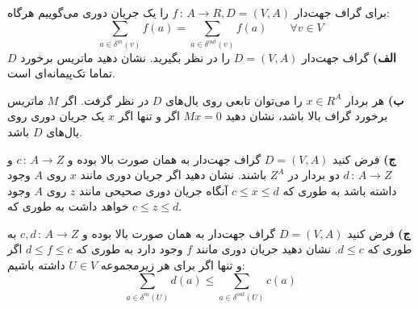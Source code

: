 برای گراف جهت‌دار
$f\,:\,A \to R, D = (V,A)$
را یک جریان دوری می‌گوییم هرگاه:
\[
    \sum_{a \in \delta^{in}(v)} f(a) =  \sum_{a \in \delta^{out}(v)} f(a) \quad \quad \forall v \in V
\]
\vspace*{5pt}
\textbf{الف)}
گراف جهت‌دار
$D = (V, A)$
را در نظر بگیرید. نشان دهید ماتریس برخورد
$D$
تماما تک‌پیمانه‌ای است.

\vspace*{5pt}
\textbf{ب)}
هر بردار
$x \in R^{A}$
را می‌توان تابعی روی یال‌های
$D$
در نظر گرفت. اگر
$M$
ماتریس برخورد گراف بالا باشد، نشان دهید
$M x = 0$
اگر و تنها اگر
$x$
یک جریان دوری روی یال‌های
$D$
باشد.

\vspace*{5pt}
\textbf{ج)}
فرض کنید
$D = (V, A)$
گراف جهت‌دار به همان صورت بالا بوده و 
$c\,:\,A \to Z$
و
$d\,:\,A \to Z$
دو بردار در
$Z^A$
باشند. نشان دهید اگر جریان دوری مانند
$x$
روی
$A$
وجود داشته باشد به طوری که 
$c \leq x \leq d$
آنگاه جریان دوری صحیحی مانند
$z$
روی
$A$
وجود خواهد داشت به طوری که
$c \leq z \leq d$.

\vspace*{5pt}
\textbf{ج)}
فرض کنید
$D = (V, A)$
گراف جهت‌دار به همان صورت بالا بوده و 
$c,d\,:\,A \to Z$
به طوری که
$d \leq c$. 
نشان دهید جریان دوری مانند
$f$
وجود دارد به طوری که 
$d \leq f \leq c$
اگر و تنها اگر برای هر زیرمجموعه
$U \in V$ 
داشته باشیم:
\[
    \sum_{a \in \delta^{in}(U)} d(a) \leq \sum_{a \in \delta^{out}(U)} c(a)  
\]